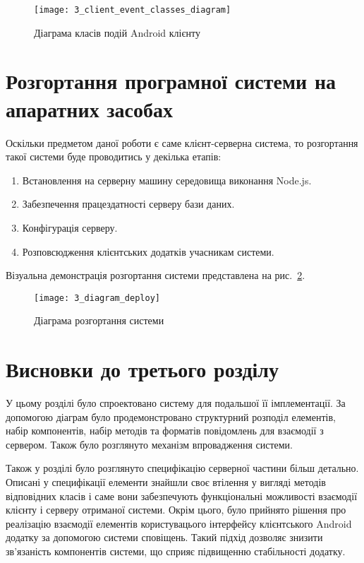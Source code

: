 \documentclass[../main.tex]{subfiles}
\begin{document}
\begin{figure}[H]
	\centering
	\texttt{[image: 3\_client\_event\_classes\_diagram]}
	\caption{Діаграма класів подій Android клієнту}
	\label{client_events}
\end{figure}

\section{Розгортання програмної системи на апаратних засобах}

Оскільки предметом даної роботи є саме клієнт-серверна система, то розгортання такої системи буде проводитись у декілька етапів:
\begin{enumerate}
	\item Встановлення на серверну машину середовища виконання Node.js.
	\item Забезпечення працездатності серверу бази даних.
	\item Конфігурація серверу.
	\item Розповсюдження клієнтських додатків учасникам системи.
\end{enumerate}

Візуальна демонстрація розгортання системи представлена на рис.~\ref{diagram_deploy}. %

\begin{figure}[H]
	\centering
	\texttt{[image: 3\_diagram\_deploy]}
	\caption{Діаграма розгортання системи}
	\label{diagram_deploy}
\end{figure}

\section{Висновки до третього розділу}

У цьому розділі було спроектовано систему для подальшої її імплементації. За допомогою діаграм було продемонстровано структурний розподіл елементів, набір компонентів, набір методів та форматів повідомлень для взаємодії з сервером. Також було розглянуто механізм впровадження системи.

Також у розділі було розглянуто специфікацію серверної частини більш детально. Описані у специфікації елементи знайшли своє втілення у вигляді методів відповідних класів і саме вони забезпечують функціональні можливості взаємодії клієнту і серверу отриманої системи. Окрім цього, було прийнято рішення про реалізацію взаємодії елементів користувацього інтерфейсу клієнтського Android додатку за допомогою системи сповіщень. Такий підхід дозволяє знизити зв'язаність компонентів системи, що сприяє підвищенню стабільності додатку.
\end{document}
